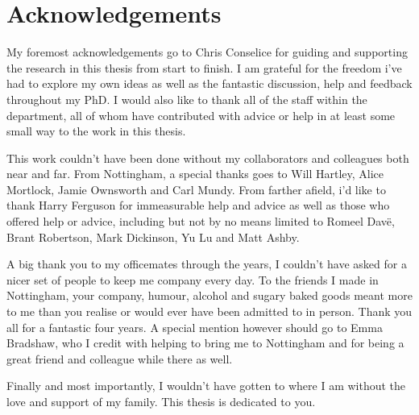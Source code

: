%
%

\chapter*{{\Huge Acknowledgements}}

My foremost acknowledgements go to Chris Conselice for guiding and supporting the research in this thesis from start to finish. I am grateful for the freedom i've had to explore my own ideas as well as the fantastic discussion, help and feedback throughout my PhD. I would also like to thank all of the staff within the department, all of whom have contributed with advice or help in at least some small way to the work in this thesis.

This work couldn't have been done without my collaborators and colleagues both near and far. From Nottingham, a special thanks goes to Will Hartley, Alice Mortlock, Jamie Ownsworth and Carl Mundy. From farther afield, i'd like to thank Harry Ferguson for immeasurable help and advice as well as those who offered help or advice, including but not by no means limited to Romeel Dav\"{e}, Brant Robertson, Mark Dickinson, Yu Lu and Matt Ashby.

A big thank you to my officemates through the years, I couldn't have asked for a nicer set of people to keep me company every day. To the friends I made in Nottingham, your company, humour, alcohol and sugary baked goods meant more to me than you realise or would ever have been admitted to in person. Thank you all for a fantastic four years. A special mention however should go to Emma Bradshaw, who I credit with helping to bring me to Nottingham and for being a great friend and colleague while there as well.

Finally and most importantly, I wouldn't have gotten to where I am without the love and support of my family. This thesis is dedicated to you.

\clearpage

